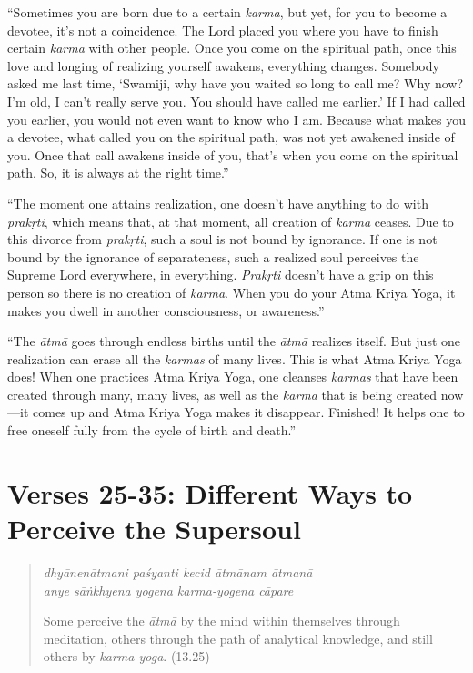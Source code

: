 \documentclass[12pt, twoside, openright]{memoir}
\begin{document}
\enquote{Sometimes you are born due to a certain \textit{karma}, but yet, for you to become a devotee, it’s not a coincidence. The Lord placed you where you have to finish certain \textit{karma} with other people. Once you come on the spiritual path, once this love and longing of realizing yourself awakens, everything changes. Somebody asked me last time, \enquote{Swamiji, why have you waited so long to call me? Why now? I’m old, I can’t really serve you. You should have called me earlier.} If I had called you earlier, you would not even want to know who I am. Because what makes you a devotee, what called you on the spiritual path, was not yet awakened inside of you. Once that call awakens inside of you, that’s when you come on the spiritual path. So, it is always at the right time.}

\enquote{The moment one attains realization, one doesn’t have anything to do with \textit{prakṛti}, which means that, at that moment, all creation of \textit{karma} ceases. Due to this divorce from \textit{prakṛti}, such a soul is not bound by ignorance. If one is not bound by the ignorance of separateness, such a realized soul perceives the Supreme Lord everywhere, in everything. \textit{Prakṛti} doesn’t have a grip on this person so there is no creation of \textit{karma}. When you do your Atma Kriya Yoga, it makes you dwell in another consciousness, or awareness.}

\enquote{The \textit{ātmā} goes through endless births until the \textit{ātmā} realizes itself. But just one realization can erase all the \textit{karmas} of many lives. This is what Atma Kriya Yoga does! When one practices Atma Kriya Yoga, one cleanses \textit{karmas} that have been created through many, many lives, as well as the \textit{karma} that is being created now---it comes up and Atma Kriya Yoga makes it disappear. Finished! It helps one to free oneself fully from the cycle of birth and death.}

\section{Verses 25-35: Different Ways to Perceive the Supersoul}\label{sec-verses-25-35-different-ways-to-perceive-the-supersoul}


\par
\begin{verse}
\textit{dhyānenātmani paśyanti kecid ātmānam ātmanā} \\
\textit{anye sāṅkhyena yogena karma-yogena cāpare}

\noindent Some perceive the \textit{ātmā} by the mind within themselves through meditation, others through the path of analytical knowledge, and still others by \textit{karma-yoga}. (13.25)
\end{verse}
\par
\end{document}
